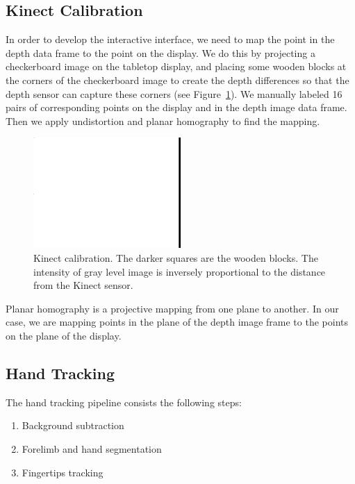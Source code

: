 \subsection{Kinect Calibration}
In order to develop the interactive interface, we need to map the point in the
depth data frame to the point on the display. We do this by projecting a
checkerboard image on the tabletop display, and placing some wooden blocks at
the corners of the checkerboard image to create the depth differences so that 
the depth sensor can capture these corners (see Figure~\ref{fig:calibration}).
We manually labeled 16 pairs of corresponding points on the display and in the depth image data frame. Then we
apply undistortion and planar homography to find the mapping.

\begin{figure}[h]
  \centering
  \includegraphics[width=0.5\textwidth]{figures/calibration.png} 
  \caption{Kinect calibration. The darker squares are the wooden blocks. The
  intensity of gray level image is inversely proportional to the distance from
  the Kinect sensor.}
  \label{fig:calibration}
\end{figure}

Planar homography is a projective mapping from one plane to another. In our
case, we are mapping points in the plane of the depth image frame to the points
on the plane of the display.

\subsection{Hand Tracking}
The hand tracking pipeline consists the following steps:

\begin{enumerate}
  \item Background subtraction
  \item Forelimb and hand segmentation
  \item Fingertips tracking
\end{enumerate}

